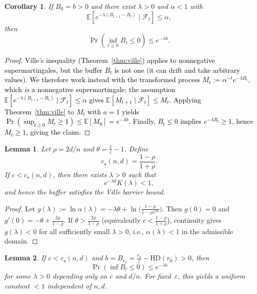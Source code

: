 \documentclass[lettersize,journal]{IEEEtran}
\newcommand{\EE}{\mathbb{E}}
\newtheorem{corollary}{Corollary}
\newtheorem{lemma}{Lemma}
\begin{document}
{\setcounter{corollary}{1}
\begin{corollary}
	
	If $B_0=b>0$ and there exist $\lambda>0$ and $\alpha<1$ with
	\[
	\EE[e^{-\lambda(B_{t+1}-B_t)}\mid\mathcal{F}_t]\le\alpha,
	\]
	then
	\[
	\Pr\!\left(\inf_{t\ge0} B_t \le 0\right) \le e^{-\lambda b}.
	\]
\end{corollary}

\begin{proof}
	\textcolor{black}{Ville's inequality (Theorem~\ref{thm:ville}) applies to nonneg\-ative
	supermartingales, but the buffer $B_t$ is not one (it can drift and take
	arbitrary values).  We therefore work instead with the transformed process
	$M_t := \alpha^{-t}e^{-\lambda B_t}$, which \emph{is} a nonneg\-ative
	supermartingale: the assumption $\EE[e^{-\lambda(B_{t+1}-B_t)}\mid\mathcal F_t]
	\le \alpha$ gives $\EE[M_{t+1}\mid\mathcal F_t]\le M_t$.
	Applying Theorem~\ref{thm:ville} to $M_t$ with $a=1$ yields
	$\Pr(\sup_{t\ge 0} M_t\ge 1)\le \EE[M_0]=e^{-\lambda b}$.
	Finally, $B_t\le 0$ implies $e^{-\lambda B_t}\ge 1$, hence $M_t\ge 1$,
	giving the claim.}
	
\end{proof}


\setcounter{theorem}{8}
\begin{lemma}%
	
	Let $\rho=2d/n$ and $\theta=\frac{1}{c}-1$.  
	Define
	\[
	c_\star(n,d)=\frac{1-\rho}{1+\rho}.
	\]
	If $c<c_\star(n,d)$, then there exists $\lambda>0$ such that
	\[
	e^{-\lambda\theta}K(\lambda) < 1,
	\]
	and hence the buffer satisfies the Ville barrier bound.
\end{lemma}

\begin{proof}
	Let $g(\lambda):=\ln\alpha(\lambda)=-\lambda\theta+\ln\!\big(\tfrac{1-\rho}{1-\rho e^{2\lambda}}\big)$. 
	Then $g(0)=0$ and $g'(0)=-\theta+\tfrac{2\rho}{1-\rho}$. 
	If $\theta>\tfrac{2\rho}{1-\rho}$ (equivalently $c<\tfrac{1-\rho}{1+\rho}$), continuity gives $g(\lambda)<0$ for all sufficiently small $\lambda>0$, i.e., $\alpha(\lambda)<1$ in the admissible domain.
\end{proof}

\setcounter{theorem}{9}
\begin{lemma}
	If $c<c_\star(n,d)$ and 
	$b=B_{r_0}=\frac{r_0}{c}-\mathrm{HD}(r_0)>0$, 
	then 
	\[
	\Pr\!\left(\inf B_t \le 0\right) \le e^{-\lambda b}
	\]
	for some $\lambda>0$ depending only on $c$ and $d/n$.  
	For fixed~$\varepsilon$, this yields a uniform constant $<1$ independent of 
	$n,d$.
\end{lemma}

}
\end{document}
